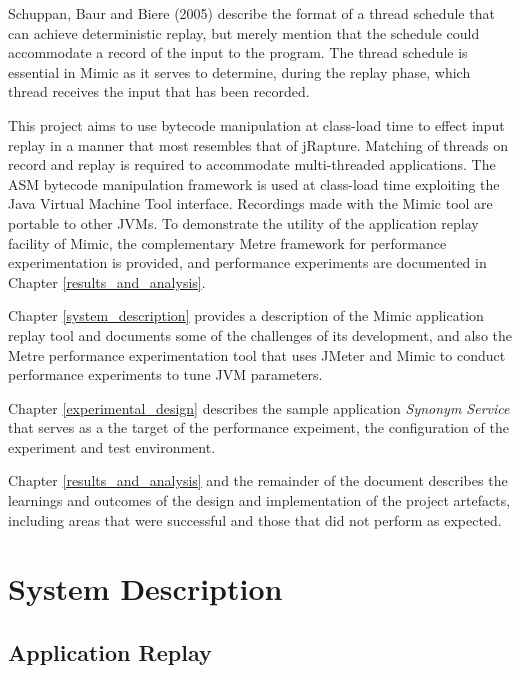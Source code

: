 \documentclass[]{final_report}
\begin{document}
Schuppan, Baur and Biere (2005)\cite{schuppan:2005} describe the format of a thread schedule that can achieve deterministic replay, but merely mention that the schedule could accommodate a record of the input to the program. The thread schedule is essential in Mimic as it serves to determine, during the replay phase, which thread receives the input that has been recorded.

This project aims to use bytecode manipulation at class-load time to effect input replay in a manner that most resembles that of jRapture. Matching of threads on record and replay is required to accommodate multi-threaded applications. The ASM bytecode manipulation framework is used at class-load time exploiting the Java Virtual Machine Tool interface. Recordings made with the Mimic tool are portable to other JVMs. To demonstrate the utility of the application replay facility of Mimic, the complementary Metre framework for performance experimentation is provided, and performance experiments are documented in Chapter \ref{results_and_analysis}.

Chapter \ref{system_description} provides a description of the Mimic application replay tool and documents some of the challenges of its development, and also the Metre performance experimentation tool that uses JMeter and Mimic to conduct performance experiments to tune JVM parameters.

Chapter \ref{experimental_design} describes the sample application \textit{Synonym Service} that serves as a the target of the performance expeiment, the configuration of the experiment and test environment.

Chapter \ref{results_and_analysis} and the remainder of the document describes the learnings and outcomes of the design and implementation of the project artefacts, including areas that were successful and those that did not perform as expected.


\chapter{System Description \label{system_description}}

\section{Application Replay \label{application_replay}}
\end{document}
